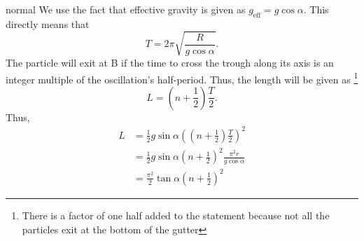 \begin{solution}{normal}
We use the fact that effective gravity is given as $g_{\text{eff}} = g\cos\alpha$. This directly means that 
\[T = 2\pi\sqrt{\frac{R}{g\cos\alpha}}.\]
The particle will exit at B if the time to cross the trough along its axis is an integer multiple of the oscillation’s half-period. Thus, the length will be given as \footnote{There is a factor of one half added to the statement because not all the particles exit at the bottom of the gutter}
\[L = \left(n + \frac{1}{2}\right)\frac{T}{2}.\]
Thus, 
\begin{align*}
    L &= \frac{1}{2}g\sin\alpha\left(\left(n + \frac{1}{2}\right)\frac{T}{2}\right)^2\\
    &= \frac{1}{2}g\sin\alpha\left(n + \frac{1}{2}\right)^2\frac{\pi^2 r}{g\cos\alpha}\\
    &= \boxed{\frac{\pi^2}{2}\tan\alpha\left(n + \frac{1}{2}\right)^2}
\end{align*}
\end{solution}
